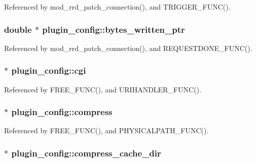 Referenced by mod\-\_\-rrd\-\_\-patch\-\_\-connection(), and T\-R\-I\-G\-G\-E\-R\-\_\-\-F\-U\-N\-C().

\hypertarget{structplugin__config_a1b61b44961e306b46d98c354d141ccec}{
\subsubsection[{bytes\-\_\-written\-\_\-ptr}]{\setlength{\rightskip}{0pt plus 5cm}double $\ast$ plugin\-\_\-config\-::bytes\-\_\-written\-\_\-ptr}}\label{structplugin__config_a1b61b44961e306b46d98c354d141ccec}


Referenced by mod\-\_\-rrd\-\_\-patch\-\_\-connection(), and R\-E\-Q\-U\-E\-S\-T\-D\-O\-N\-E\-\_\-\-F\-U\-N\-C().

\hypertarget{structplugin__config_a1e820d2000c648348113f8eab880541e}{
\subsubsection[{cgi}]{$\ast$ plugin\-\_\-config\-::cgi}}\label{structplugin__config_a1e820d2000c648348113f8eab880541e}


Referenced by F\-R\-E\-E\-\_\-\-F\-U\-N\-C(), and U\-R\-I\-H\-A\-N\-D\-L\-E\-R\-\_\-\-F\-U\-N\-C().

\hypertarget{structplugin__config_a7932fcac5458d93837e7e6e3afffa6a4}{
\subsubsection[{compress}]{$\ast$ plugin\-\_\-config\-::compress}}\label{structplugin__config_a7932fcac5458d93837e7e6e3afffa6a4}


Referenced by F\-R\-E\-E\-\_\-\-F\-U\-N\-C(), and P\-H\-Y\-S\-I\-C\-A\-L\-P\-A\-T\-H\-\_\-\-F\-U\-N\-C().

\hypertarget{structplugin__config_a0b46108e6b03529131edf5267fb2901e}{
\subsubsection[{compress\-\_\-cache\-\_\-dir}]{$\ast$ plugin\-\_\-config\-::compress\-\_\-cache\-\_\-dir}}\label{structplugin__config_a0b46108e6b03529131edf5267fb2901e}


